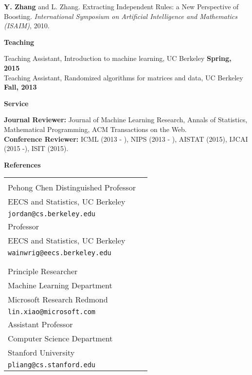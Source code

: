 \documentclass{res} %
\begin{document}
\begin{resume}
\begin{enumerate}[label={[C\arabic*]}, ref={C\arabic*}]
\item \textbf{Y. Zhang} and L. Zhang. Extracting Independent Rules: a New Perspective of Boosting. 
\emph{International Symposium on Artificial Intelligence and Mathematics (ISAIM)}, 2010. \label{a-new-isaim10}
\end{enumerate}

{\Large\bf Teaching}

\vspace{-5pt}
Teaching Assistant, Introduction to machine learning, UC Berkeley \hfill\textbf{Spring, 2015}\\
Teaching Assistant, Randomized algorithms for matrices and data, UC Berkeley \hfill\textbf{Fall, 2013}

{\Large\bf Service}

\vspace{-5pt}
{\bf Journal Reviewer:} Journal of Machine Learning Research, Annals of Statistics, Mathematical Programming, ACM Transactions on the Web. \\
{\bf Conference Reviewer:} ICML (2013 - ), NIPS (2013 - ), AISTAT (2015), IJCAI (2015 -), ISIT (2015).

{\Large\bf References}

\begin{tabular}{ll}
\begin{minipage}{0.5\textwidth}
{\bf Michael I. Jordan}\\
Pehong Chen Distinguished Professor\\
EECS and Statistics, UC Berkeley\\
{\tt jordan@cs.berkeley.edu}
\end{minipage}&
\begin{minipage}{0.5\textwidth}
{\bf Martin J. Wainwright}\\
Professor\\
EECS and Statistics, UC Berkeley\\
{\tt wainwrig@eecs.berkeley.edu}
\end{minipage}\\\\
\begin{minipage}{0.5\textwidth}
{\bf Lin Xiao}\\
Principle Researcher\\
Machine Learning Department\\
Microsoft Research Redmond\\
{\tt lin.xiao@microsoft.com}
\end{minipage}&
\begin{minipage}{0.5\textwidth}
{\bf Percy Liang}\\
Assistant Professor\\
Computer Science Department\\
Stanford University\\
{\tt pliang@cs.stanford.edu}
\end{minipage}
\end{tabular}

\end{resume}
\end{document}
